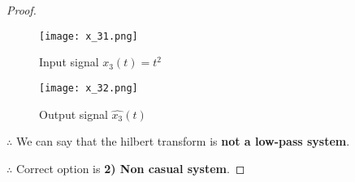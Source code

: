 \documentclass[journal,12pt,twocolumn]{IEEEtran}
\begin{document}
\begin{proof}
\begin{enumerate}
  \begin{figure}[!htp]
\centering
 \texttt{[image: x\_31.png]}
 \caption{Input signal $x_3(t)=t^2$}
 \end{figure}
 
  \begin{figure}[!htp]
\centering
 \texttt{[image: x\_32.png]}
 \caption{Output signal $\hat{x_3}(t)$}
 \label{figx3}
 \end{figure}

\newpage
$\therefore$ We can say that the hilbert transform is \textbf{not a low-pass system}.
\end{enumerate}

$\therefore$ Correct option is \textbf{2) Non casual system}.
\end{proof}
\end{document}
